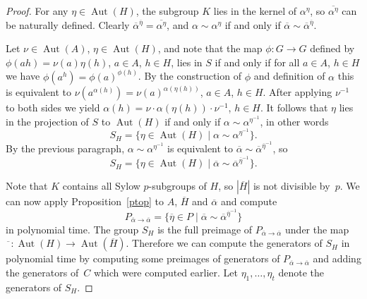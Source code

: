 \documentclass{article}
\DeclareMathOperator{\Aut}{Aut}
\begin{document}
\begin{proof}
	For any \( \eta \in \Aut(H) \), the subgroup \( K \) lies in the kernel of \( \alpha^\eta \),
	so \( \overline{\alpha^\eta} \) can be naturally defined. Clearly \( \overline{\alpha}^{\overline{\eta}} = \overline{\alpha^\eta} \),
	and \( \alpha \sim \alpha^\eta \) if and only if \( \overline{\alpha} \sim \overline{\alpha}^{\overline{\eta}} \).

	Let \( \nu \in \Aut(A) \), \( \eta \in \Aut(H) \), and note that the map \( \phi : G \to G \) defined by
	\( \phi(ah) = \nu(a)\eta(h) \), \( a \in A \), \( h \in H \), lies in \( S \) if and only if
	for all \( a \in A \), \( h \in H \) we have \( \phi(a^h) = \phi(a)^{\phi(h)} \).
	By the construction of \( \phi \) and definition of \( \alpha \) this is equivalent to
	\( \nu(a^{\alpha(h)}) = \nu(a)^{\alpha(\eta(h))} \), \( a \in A \), \( h \in H \).
	After applying \( \nu^{-1} \) to both sides we yield \( \alpha(h) = \nu \cdot \alpha(\eta(h)) \cdot \nu^{-1} \), \( h \in H \).
	It follows that \( \eta \) lies in the projection of \( S \) to \( \Aut(H) \) if and only if \( \alpha \sim \alpha^{\eta^{-1}} \), in other words
	\[ S_H = \{ \eta \in \Aut(H) \mid \alpha \sim \alpha^{\eta^{-1}} \}. \]
	By the previous paragraph, \( \alpha \sim \alpha^{\eta^{-1}} \) is equivalent to \( \overline{\alpha} \sim \overline{\alpha}^{\overline{\eta}^{-1}} \), so
	\[ S_H = \{ \eta \in \Aut(H) \mid \overline{\alpha} \sim \overline{\alpha}^{\overline{\eta}^{-1}} \}. \]

	Note that \( K \) contains all Sylow \( p \)-subgroups of \( H \), so \( |\overline{H}| \) is not divisible by~\( p \).
	We can now apply Proposition~\ref{ptop} to \( A \), \( \overline{H} \) and \( \overline{\alpha} \)
	and compute
	\[ P_{\overline{\alpha} \to \overline{\alpha}} = \{ \overline{\eta} \in P \mid
	\overline{\alpha} \sim \overline{\alpha}^{\overline{\eta}^{-1}} \} \]
	in polynomial time.
	The group \( S_H \) is the full preimage of \( P_{\overline{\alpha} \to \overline{\alpha}} \)
	under the map \( \overline{\phantom{a}} : \Aut(H) \to \Aut(\overline{H}) \). Therefore we can compute the generators of \( S_H \)
	in polynomial time by computing some preimages of generators of \( P_{\overline{\alpha} \to \overline{\alpha}} \) and adding the generators of~\( C \)
	which were computed earlier. Let \( \eta_1, \dots, \eta_t \) denote the generators of \( S_H \).


\end{proof}
\end{document}
